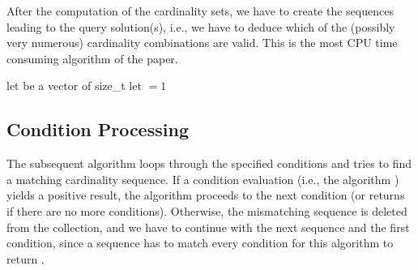 After the computation of the cardinality sets, we have to create the sequences leading to the query solution(s), i.e., we have to deduce which of the (possibly very numerous) cardinality combinations are valid. This is the most CPU time consuming algorithm of the paper.

\begin{algorithm}
  \caption{\label{alg:buildSequences}}
    let  be a vector of size\_t\;
    let  $=1$\;
\end{algorithm}

\subsection{Condition Processing}
The subsequent algorithm  loops through the specified conditions and tries to find a matching cardinality sequence. If a condition evaluation (i.e., the algorithm ) yields a positive result, the algorithm proceeds to the next condition (or returns  if there are no more conditions). Otherwise, the mismatching sequence is deleted from the collection, and we have to continue with the next sequence and the first condition, since a sequence has to match every condition for this algorithm to return .

